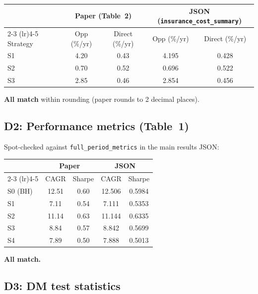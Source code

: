 \documentclass[12pt,a4paper]{article}
\begin{document}
\begin{center}
\begin{tabular}{lcccc}
\toprule
 & \multicolumn{2}{c}{Paper (Table~2)} & \multicolumn{2}{c}{JSON (\texttt{insurance\_cost\_summary})} \\
\cmidrule(lr){2-3} \cmidrule(lr){4-5}
Strategy & Opp (\%/yr) & Direct (\%/yr) & Opp (\%/yr) & Direct (\%/yr) \\
\midrule
S1 & 4.20 & 0.43 & 4.195 & 0.428 \\
S2 & 0.70 & 0.52 & 0.696 & 0.522 \\
S3 & 2.85 & 0.46 & 2.854 & 0.456 \\
\bottomrule
\end{tabular}
\end{center}

\textcolor{okgreen}{\textbf{All match}} within rounding (paper rounds to 2 decimal places).

\bigskip

\subsection*{D2: Performance metrics (Table~1)}

Spot-checked against \texttt{full\_period\_metrics} in the main results JSON:

\begin{center}
\begin{tabular}{lcccc}
\toprule
 & \multicolumn{2}{c}{Paper} & \multicolumn{2}{c}{JSON} \\
\cmidrule(lr){2-3} \cmidrule(lr){4-5}
 & CAGR & Sharpe & CAGR & Sharpe \\
\midrule
S0 (BH) & 12.51 & 0.60 & 12.506 & 0.5984 \\
S1 & 7.11 & 0.54 & 7.111 & 0.5353 \\
S2 & 11.14 & 0.63 & 11.144 & 0.6335 \\
S3 & 8.84 & 0.57 & 8.842 & 0.5699 \\
S4 & 7.89 & 0.50 & 7.888 & 0.5013 \\
\bottomrule
\end{tabular}
\end{center}

\textcolor{okgreen}{\textbf{All match.}}

\bigskip

\subsection*{D3: DM test statistics}
\end{document}
